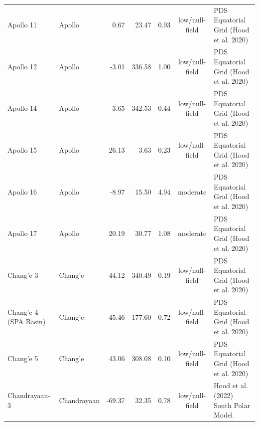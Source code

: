\begin{table}[t]
\begin{tabular}{llrrccl}
Apollo 11 & Apollo & 0.67 & 23.47 & 0.93 & low/null-field & PDS Equatorial Grid (Hood et al. 2020) \\
Apollo 12 & Apollo & -3.01 & 336.58 & 1.00 & low/null-field & PDS Equatorial Grid (Hood et al. 2020) \\
Apollo 14 & Apollo & -3.65 & 342.53 & 0.44 & low/null-field & PDS Equatorial Grid (Hood et al. 2020) \\
Apollo 15 & Apollo & 26.13 & 3.63 & 0.23 & low/null-field & PDS Equatorial Grid (Hood et al. 2020) \\
Apollo 16 & Apollo & -8.97 & 15.50 & 4.94 & moderate & PDS Equatorial Grid (Hood et al. 2020) \\
Apollo 17 & Apollo & 20.19 & 30.77 & 1.08 & moderate & PDS Equatorial Grid (Hood et al. 2020) \\
Chang'e 3 & Chang'e & 44.12 & 340.49 & 0.19 & low/null-field & PDS Equatorial Grid (Hood et al. 2020) \\
Chang'e 4 (SPA Basin) & Chang'e & -45.46 & 177.60 & 0.72 & low/null-field & PDS Equatorial Grid (Hood et al. 2020) \\
Chang'e 5 & Chang'e & 43.06 & 308.08 & 0.10 & low/null-field & PDS Equatorial Grid (Hood et al. 2020) \\
Chandrayaan-3 & Chandrayaan & -69.37 & 32.35 & 0.78 & low/null-field & Hood et al. (2022) South Polar Model \\
\bottomrule
\end{tabular}
\end{table}
